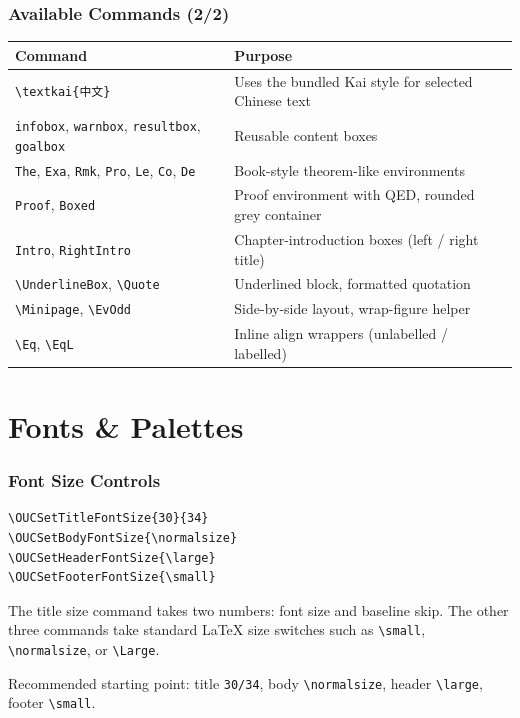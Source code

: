 \documentclass[aspectratio=169,10pt]{beamer}
\begin{document}
\begin{frame}
    \frametitle{Available Commands (2/2)}
    \renewcommand{\arraystretch}{1.2}
    \centering
    \scriptsize
    \begin{tabular}{@{}>{\columncolor{paleblue}}p{} p{}@{}}
        \toprule
        \rowcolor{primary}
        {\color{white}\bfseries Command} & {\color{white}\bfseries Purpose} \\
        \midrule
        \texttt{\textbackslash textkai\{中文\}} & Uses the bundled Kai style for selected Chinese text \\
        \texttt{infobox}, \texttt{warnbox}, \texttt{resultbox}, \texttt{goalbox} & Reusable content boxes \\
        \texttt{The}, \texttt{Exa}, \texttt{Rmk}, \texttt{Pro}, \texttt{Le}, \texttt{Co}, \texttt{De} & Book-style theorem-like environments \\
        \texttt{Proof}, \texttt{Boxed} & Proof environment with QED, rounded grey container \\
        \texttt{Intro}, \texttt{RightIntro} & Chapter-introduction boxes (left / right title) \\
        \texttt{\textbackslash UnderlineBox}, \texttt{\textbackslash Quote} & Underlined block, formatted quotation \\
        \texttt{\textbackslash Minipage}, \texttt{\textbackslash EvOdd} & Side-by-side layout, wrap-figure helper \\
        \texttt{\textbackslash Eq}, \texttt{\textbackslash EqL} & Inline align wrappers (unlabelled / labelled) \\
        \bottomrule
    \end{tabular}
\end{frame}

\section{Fonts \& Palettes}

\begin{frame}[fragile]
    \frametitle{Font Size Controls}
    \begin{lstlisting}[language={[LaTeX]TeX}]
\OUCSetTitleFontSize{30}{34}
\OUCSetBodyFontSize{\normalsize}
\OUCSetHeaderFontSize{\large}
\OUCSetFooterFontSize{\small}
    \end{lstlisting}
    \begin{infobox}
        The title size command takes two numbers: font size and baseline skip. The other three commands take standard LaTeX size switches such as \texttt{\textbackslash small}, \texttt{\textbackslash normalsize}, or \texttt{\textbackslash Large}.
    \end{infobox}
    \begin{resultbox}
        Recommended starting point: title \texttt{30/34}, body \texttt{\textbackslash normalsize}, header \texttt{\textbackslash large}, footer \texttt{\textbackslash small}.
    \end{resultbox}
\end{frame}
\end{document}
